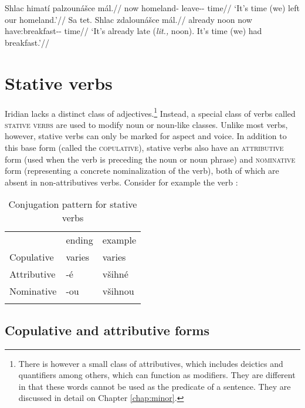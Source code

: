 \pex
\begingl
\gla Shlac himatí palzounášce mál.//
\glb now homeland-\Gen{} leave-\Lv{}-\SupN{} time//
\glft `It's time (we) left our homeland.'//
\endgl
\xe
\pex
\begingl
\gla Sa tet. Shlac zdalounášce mál.//
\glb already noon now have:breakfast-\Lv{}-\SupN{} time//
\glft `It's already late (\emph{lit.,} noon). It's time (we) had breakfast.'//
\endgl
\xe

\section{Stative verbs}\label{sec:statives}

Iridian lacks a distinct class of adjectives.\footnote{There is however a small
class of attributives, which includes deictics and
quantifiers among others, which can function as modifiers.
They are different in that these words cannot be used as the
predicate of a sentence. They are discussed in detail on
Chapter \ref{chap:minor}.} Instead, a special class of verbs called {\scshape
stative verbs} are used to modify noun or noun-like classes. Unlike most verbs,
however, stative verbs can only be marked for aspect and voice. In addition to
this base form (called the {\scshape copulative}), stative verbs also have an
{\scshape attributive} form (used when the verb is preceding the noun or noun
phrase) and {\scshape nominative} form (representing a concrete nominalization
of the verb), both of which are absent in non-attributives verbs. Consider for
example the verb  :

\begin{table}[ht]
	\sffamily\footnotesize
	\caption{Conjugation pattern for stative verbs}
	\medskip
	\begin{tabu} to 0.7
		\toprule
		&{\sc ending}&{\sc example}\\\addlinespace
		\midrule\addlinespace
		Copulative & varies & varies\\\addlinespace
		Attributive & {-é} & {všihné}\\\addlinespace
		Nominative & {-ou}	& {všihnou}\\\addlinespace
		\bottomrule
	\end{tabu}
\end{table}

\subsection{Copulative and attributive forms}

